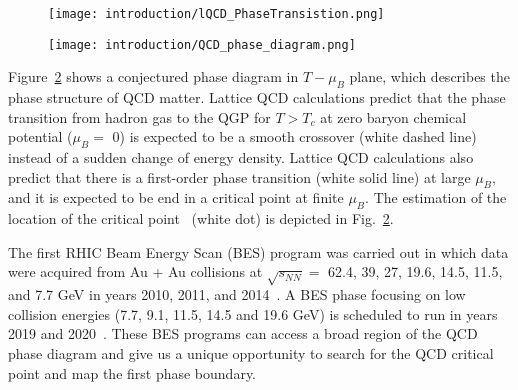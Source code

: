 \begin{figure}[htbp]
\centering
\texttt{[image: introduction/lQCD\_PhaseTransistion.png]}
 \label{lQCD_PT}
\end{figure}

\begin{figure}[htbp]
\centering
\texttt{[image: introduction/QCD\_phase\_diagram.png]}
 \label{QCDpd}
\end{figure}

Figure~\ref{QCDpd} shows a conjectured phase diagram in $T-\mu_{B}$ plane, which describes the phase structure of QCD matter. Lattice QCD calculations predict that the phase transition from hadron gas to the QGP for $T>T_{c}$ at zero baryon chemical potential ($\mu_{B}=$ 0) is expected to be a smooth crossover (white dashed line) instead of a sudden change of energy density. Lattice QCD calculations also predict that there is a first-order phase transition (white solid line) at large $\mu_{B}$, and it is expected to be end in a critical point at finite $\mu_{B}$. The estimation of the location of the critical point~\cite{CriticalPoint} (white dot) is depicted in Fig.~\ref{QCDpd}.

The first RHIC Beam Energy Scan (BES) program was carried out in which data were acquired from Au + Au collisions at $\sqrt{s_{NN}}=$ 62.4, 39, 27, 19.6, 14.5, 11.5, and 7.7 GeV in years 2010, 2011, and 2014~\cite{BESI}. A BES phase \uppercase\expandafter{} focusing on low collision energies (7.7, 9.1, 11.5, 14.5 and 19.6 GeV) is scheduled to run in years 2019 and 2020~\cite{BESII}. These BES programs can access a broad region of the QCD phase diagram and give us a unique opportunity to search for the QCD critical point and map the first phase boundary.


